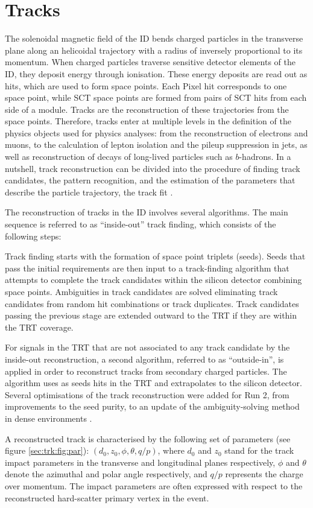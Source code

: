 \section{Tracks}
\label{chp:obj:trk}

The solenoidal magnetic field of the ID bends charged particles in the transverse plane along an helicoidal trajectory with a radius of inversely proportional to its momentum. When charged particles traverse sensitive detector elements of the ID, they deposit energy through ionisation. These energy deposits are read out as hits, which are used to form space points. Each Pixel hit corresponds to one space point, while SCT space points are formed from pairs of SCT hits from each side of a module.
Tracks are the reconstruction of these trajectories from the space points. Therefore, tracks enter at multiple levels in the definition of the physics objects used for physics analyses: from the reconstruction of electrons and muons, to the calculation of lepton isolation and the pileup suppression in jets, as well as reconstruction of decays of long-lived particles such as $b$-hadrons.
In a nutshell, track reconstruction can be divided into the procedure of finding track candidates, the pattern recognition, and the estimation of the parameters that describe the particle trajectory, the track fit \cite{Cornelissen:1020106}.\par
The reconstruction of tracks in the ID involves several algorithms. The main sequence is referred to as ``inside-out'' track finding, which consists of the following steps:

\bi
\ib  Track finding starts with the formation of space point triplets (seeds).
\ib  Seeds that pass the initial requirements are then input to a track-finding algorithm that attempts to complete the track candidates within the silicon detector combining space points.
\ib Ambiguities in track candidates are solved eliminating track candidates from random hit combinations or track duplicates. 
\ib Track candidates passing the previous stage are extended outward to the TRT if they are within the TRT coverage.
\ei

\noindent For signals in the TRT that are not associated to any track candidate by the inside-out reconstruction, a second algorithm, referred to as ``outside-in'', is applied in order to reconstruct tracks from secondary charged particles. The algorithm uses as seeds hits in the TRT and extrapolates to the silicon detector.
Several optimisations of the track reconstruction were added for Run 2, from improvements to the seed purity, to an update of the ambiguity-solving method in dense environments \cite{ATL-PHYS-PUB-2015-006}.\par
A reconstructed track is characterised by the following set of parameters (see figure \ref{sec:trk:fig:par}): $(d_{0},z_{0}, \phi, \theta, q/p )$, where
$d_{0}$ and $z_{0}$ stand for the track impact parameters in the transverse and longitudinal planes respectively, $\phi$ and $\theta$ denote the azimuthal and polar angle respectively, and $q/p$ represents the charge over momentum. The impact parameters are often expressed with respect to the reconstructed hard-scatter primary vertex in the event.

